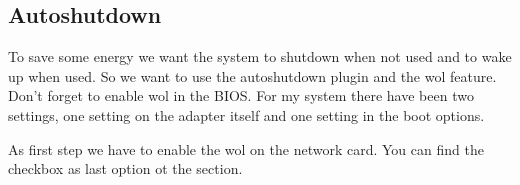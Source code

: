 

\subsection{Autoshutdown}\label{subsec:Autoshutdown}

To save some energy we want the system to shutdown when not used and to wake up
when used. So we want to use the autoshutdown plugin and the \gls{wol} feature.
 Don't forget to enable \gls{wol} in the BIOS. For my system
there have been two settings, one setting on the adapter itself and one setting
in the boot options.


As first step we have to enable the \gls{wol} on the network card. You can find
the checkbox as last option ot the  section.


